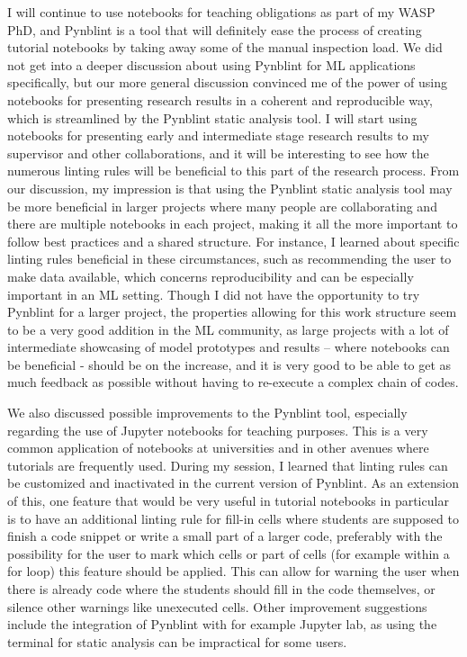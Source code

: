 \documentclass{article}
\begin{document}
I will continue to use notebooks for teaching obligations as part of my WASP PhD, and Pynblint is a tool that will definitely ease the process of creating tutorial notebooks by taking away some of the manual inspection load. We did not get into a deeper discussion about using Pynblint for ML applications specifically, but our more general discussion convinced me of the power of using notebooks for presenting research results in a coherent and reproducible way, which is streamlined by the Pynblint static analysis tool. I will start using notebooks for presenting early and intermediate stage research results to my supervisor and other collaborations, and it will be interesting to see how the numerous linting rules will be beneficial to this part of the research process. From our discussion, my impression is that using the Pynblint static analysis tool may be more beneficial in larger projects where many people are collaborating and there are multiple notebooks in each project, making it all the more important to follow best practices and a shared structure. For instance, I learned about specific linting rules beneficial in these circumstances, such as recommending the user to make data available, which concerns reproducibility and can be especially important in an ML setting. Though I did not have the opportunity to try Pynblint for a larger project, the properties allowing for this work structure seem to be a very good addition in the ML community, as large projects with a lot of intermediate showcasing of model prototypes and results – where notebooks can be beneficial - should be on the increase, and it is very good to be able to get as much feedback as possible without having to re-execute a complex chain of codes. 

We also discussed possible improvements to the Pynblint tool, especially regarding the use of Jupyter notebooks for teaching purposes. This is a very common application of notebooks at universities and in other avenues where tutorials are frequently used. During my session, I learned that linting rules can be customized and inactivated in the current version of Pynblint. As an extension of this, one feature that would be very useful in tutorial notebooks in particular is to have an additional linting rule for fill-in cells where students are supposed to finish a code snippet or write a small part of a larger code, preferably with the possibility for the user to mark which cells or part of cells (for example within a for loop) this feature should be applied. This can allow for warning the user when there is already code where the students should fill in the code themselves, or silence other warnings like unexecuted cells. Other improvement suggestions include the integration of Pynblint with for example Jupyter lab, as using the terminal for static analysis can be impractical for some users.
\end{document}
